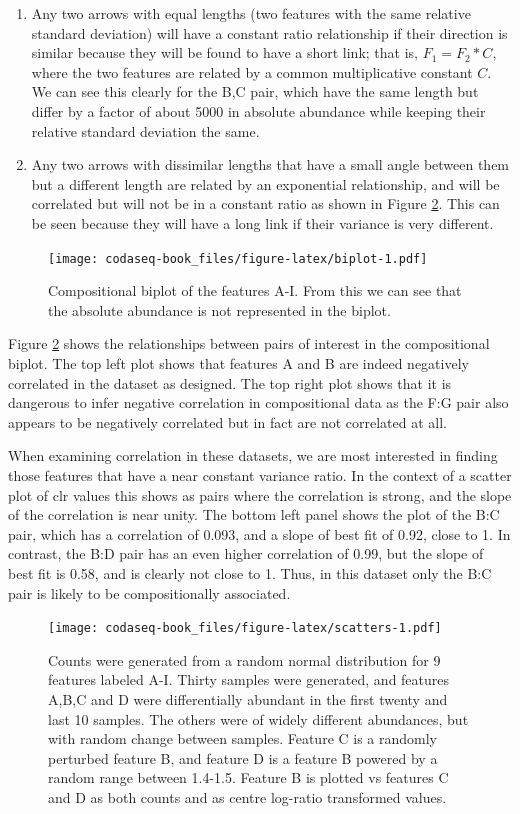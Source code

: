 \documentclass[
  onecolumn]{article}
\begin{document}
\begin{enumerate}
\item
  Any two arrows with equal lengths (two features with the same relative standard deviation) will have a constant ratio relationship if their direction is similar because they will be found to have a short link; that is, \(F_1 = F_2 * C\), where the two features are related by a common multiplicative constant \(C\). We can see this clearly for the B,C pair, which have the same length but differ by a factor of about 5000 in absolute abundance while keeping their relative standard deviation the same.
\item
  Any two arrows with dissimilar lengths that have a small angle between them but a different length are related by an exponential relationship, and will be correlated but will not be in a constant ratio as shown in Figure \ref{fig:scatters}. This can be seen because they will have a long link if their variance is very different.
\end{enumerate}

\begin{figure}
\centering
\texttt{[image: codaseq-book\_files/figure-latex/biplot-1.pdf]}
\caption{\label{fig:biplot}Compositional biplot of the features A-I. From this we can see that the absolute abundance is not represented in the biplot.}
\end{figure}

Figure \ref{fig:scatters} shows the relationships between pairs of interest in the compositional biplot. The top left plot shows that features A and B are indeed negatively correlated in the dataset as designed. The top right plot shows that it is dangerous to infer negative correlation in compositional data as the F:G pair also appears to be negatively correlated but in fact are not correlated at all.

When examining correlation in these datasets, we are most interested in finding those features that have a near constant variance ratio. In the context of a scatter plot of clr values this shows as pairs where the correlation is strong, and the slope of the correlation is near unity. The bottom left panel shows the plot of the B:C pair, which has a correlation of 0.093, and a slope of best fit of 0.92, close to 1. In contrast, the B:D pair has an even higher correlation of 0.99, but the slope of best fit is 0.58, and is clearly not close to 1. Thus, in this dataset only the B:C pair is likely to be compositionally associated.

\begin{figure}
\centering
\texttt{[image: codaseq-book\_files/figure-latex/scatters-1.pdf]}
\caption{\label{fig:scatters}Counts were generated from a random normal distribution for 9 features labeled A-I. Thirty samples were generated, and features A,B,C and D were differentially abundant in the first twenty and last 10 samples. The others were of widely different abundances, but with random change between samples. Feature C is a randomly perturbed feature B, and feature D is a feature B powered by a random range between 1.4-1.5. Feature B is plotted vs features C and D as both counts and as centre log-ratio transformed values.}
\end{figure}
\end{document}
